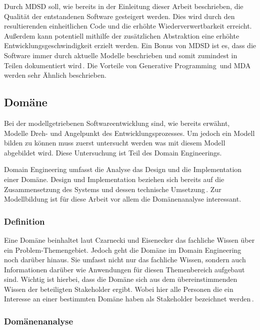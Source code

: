 \documentclass[12pt,oneside,a4paper,parskip]{scrbook}
\begin{document}
Durch MDSD soll, wie bereits in der Einleitung dieser Arbeit beschrieben, die Qualität der entstandenen Software gesteigert werden. Dies wird durch den resultierenden einheitlichen Code und die erhöhte Wiederverwertbarkeit erreicht. Außerdem kann potentiell mithilfe der zusätzlichen Abstraktion eine erhöhte Entwicklungsgeschwindigkeit erzielt werden. Ein Bonus von MDSD ist es, dass die Software immer durch aktuelle Modelle beschrieben und somit zumindest in Teilen dokumentiert wird\,\cite[S. 13ff.]{stahl2007}. Die Vorteile von Generative Programming\,\cite[S. 13ff.]{czaeis2000} und MDA\,\cite{mdaguide} werden sehr Ähnlich beschrieben.

\subsection{Domäne}

Bei der modellgetriebenen Softwareentwicklung sind, wie bereits erwähnt, Modelle Dreh- und Angelpunkt des Entwicklungsprozesses. Um jedoch ein Modell bilden zu können muss zuerst untersucht werden was mit diesem Modell abgebildet wird. Diese Untersuchung ist Teil des Domain Engineerings.

Domain Engineering umfasst die Analyse das Design und die Implementation einer Domäne. Design und Implementation beziehen sich bereits auf die Zusammensetzung des Systems und dessen technische Umsetzung\,\cite[S. 21f.]{czaeis2000}. Zur Modellbildung ist für diese Arbeit vor allem die Domänenanalyse interessant.

\subsubsection{Definition}

Eine Domäne beinhaltet laut Czarnecki und Eisenecker das fachliche Wissen über ein Problem-Themengebiet. Jedoch geht die Domäne im Domain Engineering noch darüber hinaus. Sie umfasst nicht nur das fachliche Wissen, sondern auch Informationen darüber wie Anwendungen für diesen Themenbereich aufgebaut sind. Wichtig ist hierbei, dass die Domäne sich aus dem übereinstimmenden Wissen der beteiligten Stakeholder ergibt. Wobei hier alle Personen die ein Interesse an einer bestimmten Domäne haben als Stakeholder bezeichnet werden\,\cite[S. 33]{czaeis2000}.

\subsubsection{Domänenanalyse}
\end{document}
